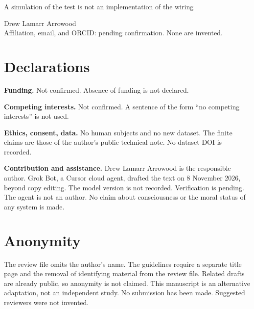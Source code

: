 \documentclass[11pt]{article}
\begin{document}
\begin{center}
{\Large A simulation of the test is not an implementation of the wiring\par}
\vspace{0.8em}
Drew Lamarr Arrowood\\
Affiliation, email, and ORCID: pending confirmation. None are invented.
\end{center}
\section*{Declarations}
\textbf{Funding.} Not confirmed. Absence of funding is not declared.

\textbf{Competing interests.} Not confirmed. A sentence of the form ``no competing interests'' is not used.

\textbf{Ethics, consent, data.} No human subjects and no new dataset. The finite claims are those of the author's public technical note. No dataset DOI is recorded.

\textbf{Contribution and assistance.} Drew Lamarr Arrowood is the responsible author. Grok Bot, a Cursor cloud agent, drafted the text on 8 November 2026, beyond copy editing. The model version is not recorded. Verification is pending. The agent is not an author. No claim about consciousness or the moral status of any system is made.

\section*{Anonymity}
The review file omits the author's name. The guidelines require a separate title page and the removal of identifying material from the review file. Related drafts are already public, so anonymity is not claimed. This manuscript is an alternative adaptation, not an independent study. No submission has been made. Suggested reviewers were not invented.
\end{document}
